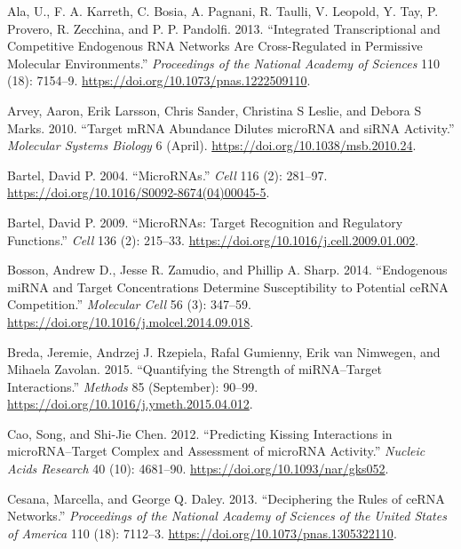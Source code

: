 \documentclass[]{article}
\begin{document}
\hypertarget{refs}{}
\leavevmode\hypertarget{ref-ala_integrated_2013}{}%
Ala, U., F. A. Karreth, C. Bosia, A. Pagnani, R. Taulli, V. Leopold, Y.
Tay, P. Provero, R. Zecchina, and P. P. Pandolfi. 2013. ``Integrated
Transcriptional and Competitive Endogenous RNA Networks Are
Cross-Regulated in Permissive Molecular Environments.''
\emph{Proceedings of the National Academy of Sciences} 110 (18):
7154--9. \url{https://doi.org/10.1073/pnas.1222509110}.

\leavevmode\hypertarget{ref-arvey_target_2010}{}%
Arvey, Aaron, Erik Larsson, Chris Sander, Christina S Leslie, and Debora
S Marks. 2010. ``Target mRNA Abundance Dilutes microRNA and siRNA
Activity.'' \emph{Molecular Systems Biology} 6 (April).
\url{https://doi.org/10.1038/msb.2010.24}.

\leavevmode\hypertarget{ref-bartel_micrornas_2004}{}%
Bartel, David P. 2004. ``MicroRNAs.'' \emph{Cell} 116 (2): 281--97.
\url{https://doi.org/10.1016/S0092-8674(04)00045-5}.

\leavevmode\hypertarget{ref-bartel_micrornas:_2009}{}%
Bartel, David P. 2009. ``MicroRNAs: Target Recognition and Regulatory
Functions.'' \emph{Cell} 136 (2): 215--33.
\url{https://doi.org/10.1016/j.cell.2009.01.002}.

\leavevmode\hypertarget{ref-bosson_endogenous_2014}{}%
Bosson, Andrew D., Jesse R. Zamudio, and Phillip A. Sharp. 2014.
``Endogenous miRNA and Target Concentrations Determine Susceptibility to
Potential ceRNA Competition.'' \emph{Molecular Cell} 56 (3): 347--59.
\url{https://doi.org/10.1016/j.molcel.2014.09.018}.

\leavevmode\hypertarget{ref-breda_quantifying_2015}{}%
Breda, Jeremie, Andrzej J. Rzepiela, Rafal Gumienny, Erik van Nimwegen,
and Mihaela Zavolan. 2015. ``Quantifying the Strength of miRNA--Target
Interactions.'' \emph{Methods} 85 (September): 90--99.
\url{https://doi.org/10.1016/j.ymeth.2015.04.012}.

\leavevmode\hypertarget{ref-cao_predicting_2012}{}%
Cao, Song, and Shi-Jie Chen. 2012. ``Predicting Kissing Interactions in
microRNA--Target Complex and Assessment of microRNA Activity.''
\emph{Nucleic Acids Research} 40 (10): 4681--90.
\url{https://doi.org/10.1093/nar/gks052}.

\leavevmode\hypertarget{ref-cesana_deciphering_2013}{}%
Cesana, Marcella, and George Q. Daley. 2013. ``Deciphering the Rules of
ceRNA Networks.'' \emph{Proceedings of the National Academy of Sciences
of the United States of America} 110 (18): 7112--3.
\url{https://doi.org/10.1073/pnas.1305322110}.
\end{document}
